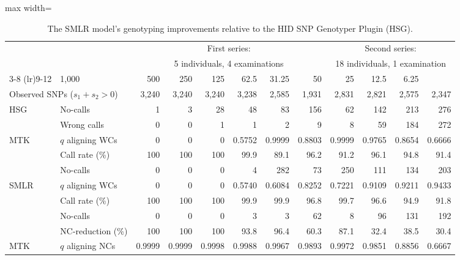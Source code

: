 \begin{table*}
\centering
\caption{The SMLR model's genotyping improvements relative to the HID SNP Genotyper Plugin (HSG).} 
\label{tab:NC_WC}
\vspace{1mm}
\begin{adjustbox}{max width=\textwidth}
\begin{threeparttable}
\begin{tabular}{llrrrrrrrrrr}
  \toprule[2pt]
\null & \null & \multicolumn{6}{c}{First series:} & \multicolumn{4}{c}{Second series:} \\
\null & \null & \multicolumn{6}{c}{5 individuals, 4 examinations} & \multicolumn{4}{c}{18 individuals, 1 examination} \\
\cmidrule(lr){3-8} \cmidrule(lr){9-12}
\multicolumn{2}{l}{DNA quantity (\si{\pg})} & 1,000 & 500 & 250 & 125 & 62.5 & 31.25 & 50 & 25 & 12.5 & 6.25 \\ 
\multicolumn{2}{l}{Observed SNPs ($s_1\!+\!s_2\!>\!0$)} & 3,240 & 3,240 & 3,240 & 3,238 & 2,585 & 1,931 & 2,831 & 2,821 & 2,575 & 2,347 \\ 
\midrule[2pt]
\multirow{2}{*}{HSG} & No-calls & 1 & 3 & 28 & 48 & 83 & 156 & 62 & 142 & 213 & 276 \\ 
   & Wrong calls & 0 & 0 & 1 & 1 & 2 & 9 & 8 & 59 & 184 & 272 \\ 
\midrule[1pt]
\midrule[1pt]
\multirow{3}{*}{MTK\tnote{$*$}}  & $q$ aligning WCs\tnote{$\dagger$} & 0 & 0 & 0 & 0.5752 & 0.9999 & 0.8803 & 0.9999 & 0.9765 & 0.8654 & 0.6666 \\ 
\cmidrule(lr){2-12}
   & Call rate (\%) & 100 & 100 & 100 & 99.9 & 89.1 & 96.2 & 91.2 & 96.1 & 94.8 & 91.4 \\ 
   & No-calls & 0 & 0 & 0 & 4 & 282 & 73 & 250 & 111 & 134 & 203 \\ 
\midrule[2pt]
\multirow{4}{*}{SMLR\tnote{$\S$}}  & $q$ aligning WCs\tnote{$\dagger$} & 0 & 0 & 0 & 0.5740 & 0.6084 & 0.8252 & 0.7221 & 0.9109 & 0.9211 & 0.9433 \\ 
\cmidrule(lr){2-12}
   & Call rate (\%) & 100 & 100 & 100 & 99.9 & 99.9 & 96.8 & 99.7 & 96.6 & 94.9 & 91.8 \\ 
   & No-calls & 0 & 0 & 0 & 3 & 3 & 62 & 8 & 96 & 131 & 192 \\ 
\cmidrule(lr){2-12}
   & NC-reduction (\%) & 100 & 100 & 100 & 93.8 & 96.4 & 60.3 & 87.1 & 32.4 & 38.5 & 30.4 \\ 
\midrule[1pt]
\midrule[1pt]
\multirow{3}{*}{MTK\tnote{$*$}} & $q$ aligning NCs\tnote{$\ddagger$} & 0.9999 & 0.9999 & 0.9998 & 0.9988 & 0.9967 & 0.9893 & 0.9972 & 0.9851 & 0.8856 & 0.6667 \\ 

\end{tabular}
\end{threeparttable}
\end{adjustbox}
\end{table*}

